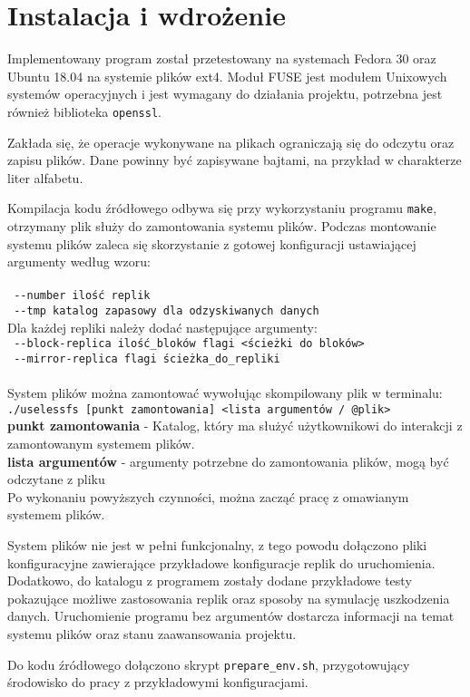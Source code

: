 \chapter{Instalacja i wdrożenie}
\thispagestyle{chapterBeginStyle}

Implementowany program został przetestowany na systemach Fedora 30 oraz Ubuntu 18.04 na systemie plików ext4. Moduł FUSE jest modułem Unixowych systemów operacyjnych i jest wymagany do działania projektu, potrzebna jest również biblioteka \verb|openssl|.

Zakłada się, że operacje wykonywane na plikach ograniczają się do odczytu oraz zapisu plików. Dane powinny być zapisywane bajtami, na przykład w charakterze liter alfabetu.

Kompilacja kodu źródłowego odbywa się przy wykorzystaniu programu \verb|make|, otrzymany plik służy do zamontowania systemu plików. Podczas montowanie systemu plików zaleca się skorzystanie z gotowej konfiguracji ustawiającej argumenty według wzoru:
\\
\\
\verb| --number ilość replik| \\
\verb| --tmp katalog zapasowy dla odzyskiwanych danych| \\

Dla każdej repliki należy dodać następujące argumenty:
\\
\verb| --block-replica ilość_bloków flagi <ścieżki do bloków>| \\
\verb| --mirror-replica flagi ścieżka_do_repliki | \\
\\

System plików można zamontować wywołując skompilowany plik w terminalu:
\\
 \verb|./uselessfs [punkt zamontowania] <lista argumentów / @plik>|
\\
\textbf{punkt zamontowania} - Katalog, który ma służyć użytkownikowi do interakcji z zamontowanym systemem plików.
\\
\textbf{lista argumentów}  - argumenty potrzebne do zamontowania plików, mogą być odczytane z pliku \\
Po wykonaniu powyższych czynności, można zacząć pracę z omawianym systemem plików.

System plików nie jest w pełni funkcjonalny, z tego powodu dołączono pliki konfiguracyjne zawierające przykładowe konfiguracje replik do uruchomienia.
Dodatkowo, do katalogu z programem zostały dodane przykładowe testy pokazujące możliwe zastosowania replik oraz sposoby na symulację uszkodzenia danych. Uruchomienie programu bez argumentów dostarcza informacji na temat systemu plików oraz stanu zaawansowania projektu.

Do kodu źródłowego dołączono skrypt \verb|prepare_env.sh|, przygotowujący środowisko do pracy z przykładowymi konfiguracjami.

